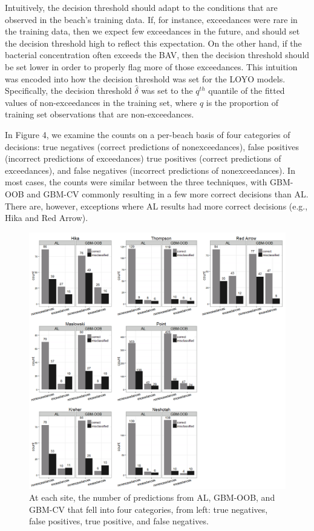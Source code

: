 Intuitively, the decision threshold should adapt to the conditions that
are observed in the beach's training data. If, for instance, exceedances
were rare in the training data, then we expect few exceedances in the
future, and should set the decision threshold high to reflect this
expectation. On the other hand, if the bacterial concentration often
exceeds the BAV, then the decision threshold should be set lower in
order to properly flag more of those exceedances. This intuition was
encoded into how the decision threshold was set for the LOYO models.
Specifically, the decision threshold \(\hat{\delta}\) was set to the
\(q^{th}\) quantile of the fitted values of non-exceedances in the
training set, where \(q\) is the proportion of training set observations
that are non-exceedances.

In Figure 4, we examine the counts on a per-beach basis of four
categories of decisions: true negatives (correct predictions of
nonexceedances), false positives (incorrect predictions of exceedances)
true positives (correct predictions of exceedances), and false negatives
(incorrect predictions of nonexceedances). In most cases, the counts
were similar between the three techniques, with GBM-OOB and GBM-CV
commonly resulting in a few more correct decisions than AL. There are,
however, exceptions where AL results had more correct decisions (e.g.,
Hika and Red Arrow).

\begin{figure}[htbp]
\centering
\includegraphics{figure/counts-barcharts.png}
\caption{At each site, the number of predictions from AL, GBM-OOB, and
GBM-CV that fell into four categories, from left: true negatives, false
positives, true positive, and false negatives.}
\end{figure}


